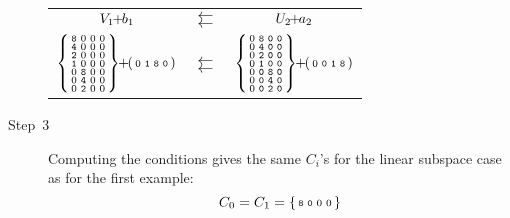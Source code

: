 \begin{example}
\begin{description}
\begin{center}
\begin{tabular}{ccc}
                $V_1 \!\! + \!\! b_1$ & $\leftleftarrows$ & $U_2 \!\! + \!\! a_2$ \\
                $\begin{Bsmallmatrix}
                    \mathtt{8} & 0 & 0 & 0 \\
                    \mathtt{4} & 0 & 0 & 0 \\
                    \mathtt{2} & 0 & 0 & 0 \\
                    \mathtt{1} & 0 & 0 & 0 \\
                    0 & \mathtt{8} & 0 & 0 \\
                    0 & \mathtt{4} & 0 & 0 \\
                    0 & \mathtt{2} & 0 & 0 \\
                \end{Bsmallmatrix} \!\! + \!\! \begin{psmallmatrix} 0 & \mathtt{1} & \mathtt{8} & \mathtt{0} \end{psmallmatrix}$
                & $\leftleftarrows$ &
                $\begin{Bsmallmatrix}
                    0 & \mathtt{8} & \mathtt{0} & \mathtt{0} \\
                    0 & \mathtt{4} & \mathtt{0} & \mathtt{0} \\
                    0 & \mathtt{2} & \mathtt{0} & \mathtt{0} \\
                    0 & \mathtt{1} & \mathtt{0} & \mathtt{0} \\
                    0 & \mathtt{0} & \mathtt{8} & \mathtt{0} \\
                    0 & \mathtt{0} & \mathtt{4} & \mathtt{0} \\
                    0 & \mathtt{0} & \mathtt{2} & \mathtt{0} \\
                \end{Bsmallmatrix} \!\! + \!\! \begin{psmallmatrix} 0 & \mathtt{0} & \mathtt{1} & \mathtt{8} \end{psmallmatrix}$
            \end{tabular}
            \end{center}
        \item[Step~3] Computing the conditions gives the same $C_i$'s for the linear subspace case as for the first example:
            \begin{equation*}
                C_0 = C_1 = \begin{Bsmallmatrix}
                    \mathtt{8} & \mathtt{0} & 0 & 0 \\

\end{Bsmallmatrix}
\end{equation*}
\end{description}
\end{example}
